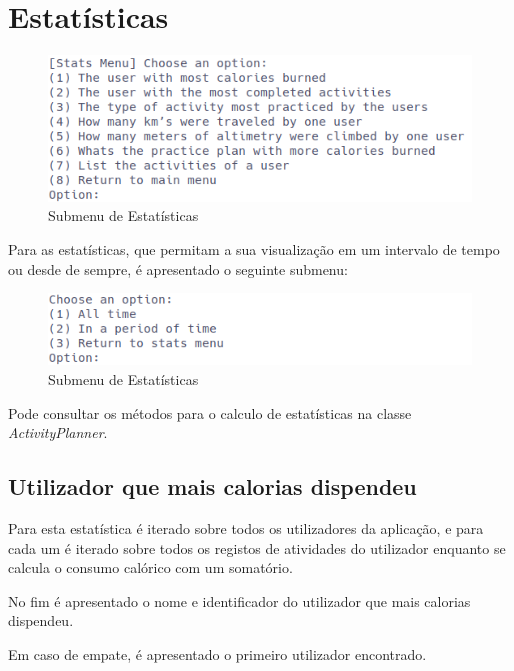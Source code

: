 \documentclass[a4paper,12pt]{scrreprt}
\begin{document}
\clearpage
\section{Estatísticas}
    \label{sec:estatisticas}

    \begin{figure}[!ht]
        \centering
        \includegraphics[width=\textwidth]{images/statsMenu.png}
        \caption{Submenu de Estatísticas}
        \label{fig:menu-stats}
    \end{figure}

    Para as estatísticas, que permitam a sua visualização em um intervalo de
    tempo ou desde de sempre, é apresentado o seguinte submenu:

    \begin{figure}[!ht]
        \centering
        \includegraphics[width=\textwidth]{images/statsSubMenu.png}
        \caption{Submenu de Estatísticas}
        \label{fig:submenu-stats}
    \end{figure}

    Pode consultar os métodos para o calculo de estatísticas na classe \textit{ActivityPlanner}.

    \subsection{Utilizador que mais calorias dispendeu}
        Para esta estatística é iterado sobre todos os utilizadores da aplicação,
        e para cada um é iterado sobre todos os registos de atividades do utilizador
        enquanto se calcula o consumo calórico com um somatório.

        No fim é apresentado o nome e identificador do utilizador que mais calorias dispendeu.

        Em caso de empate, é apresentado o primeiro utilizador encontrado.
\end{document}
